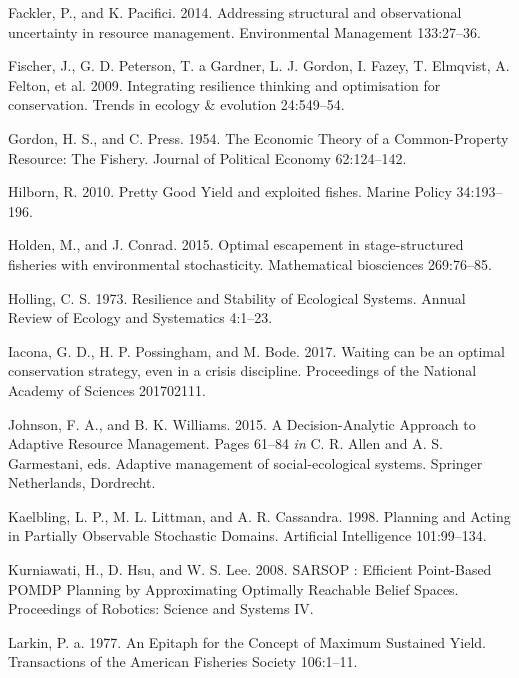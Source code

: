 \documentclass[3p]{elsarticle} %
\begin{document}
\leavevmode\hypertarget{ref-Fackler2014}{}%
Fackler, P., and K. Pacifici. 2014. Addressing structural and
observational uncertainty in resource management. Environmental
Management 133:27--36.

\leavevmode\hypertarget{ref-Fischer2009}{}%
Fischer, J., G. D. Peterson, T. a Gardner, L. J. Gordon, I. Fazey, T.
Elmqvist, A. Felton, et al. 2009. Integrating resilience thinking and
optimisation for conservation. Trends in ecology \& evolution
24:549--54.

\leavevmode\hypertarget{ref-Gordon1954}{}%
Gordon, H. S., and C. Press. 1954. The Economic Theory of a
Common-Property Resource: The Fishery. Journal of Political Economy
62:124--142.

\leavevmode\hypertarget{ref-Hilborn2010}{}%
Hilborn, R. 2010. Pretty Good Yield and exploited fishes. Marine Policy
34:193--196.

\leavevmode\hypertarget{ref-Holden2015}{}%
Holden, M., and J. Conrad. 2015. Optimal escapement in stage-structured
fisheries with environmental stochasticity. Mathematical biosciences
269:76--85.

\leavevmode\hypertarget{ref-Holling1973}{}%
Holling, C. S. 1973. Resilience and Stability of Ecological Systems.
Annual Review of Ecology and Systematics 4:1--23.

\leavevmode\hypertarget{ref-Iacona2017}{}%
Iacona, G. D., H. P. Possingham, and M. Bode. 2017. Waiting can be an
optimal conservation strategy, even in a crisis discipline. Proceedings
of the National Academy of Sciences 201702111.

\leavevmode\hypertarget{ref-Johnson2015}{}%
Johnson, F. A., and B. K. Williams. 2015. A Decision-Analytic Approach
to Adaptive Resource Management. Pages 61--84 \emph{in} C. R. Allen and
A. S. Garmestani, eds. Adaptive management of social-ecological systems.
Springer Netherlands, Dordrecht.

\leavevmode\hypertarget{ref-Kaelbling1998}{}%
Kaelbling, L. P., M. L. Littman, and A. R. Cassandra. 1998. Planning and
Acting in Partially Observable Stochastic Domains. Artificial
Intelligence 101:99--134.

\leavevmode\hypertarget{ref-Kurniawati2008}{}%
Kurniawati, H., D. Hsu, and W. S. Lee. 2008. SARSOP : Efficient
Point-Based POMDP Planning by Approximating Optimally Reachable Belief
Spaces. Proceedings of Robotics: Science and Systems IV.

\leavevmode\hypertarget{ref-Larkin1977}{}%
Larkin, P. a. 1977. An Epitaph for the Concept of Maximum Sustained
Yield. Transactions of the American Fisheries Society 106:1--11.
\end{document}
